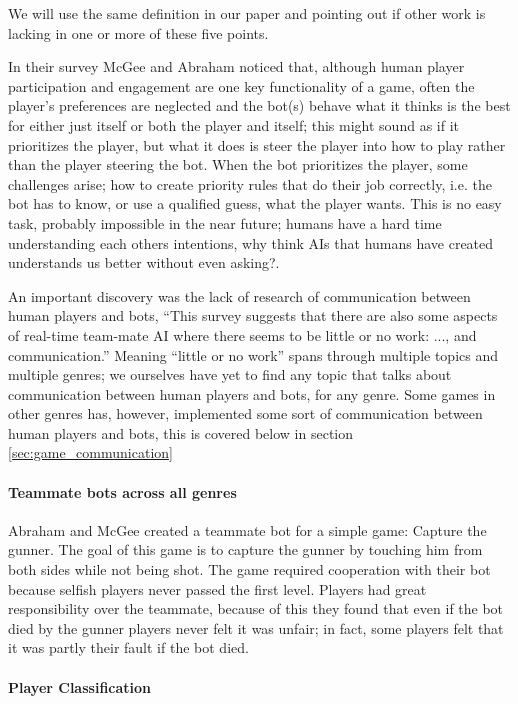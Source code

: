 We will use the same definition in our paper and pointing out if other work is lacking in one or more of these five points.

In their survey\cite{mcgee10} McGee and Abraham noticed that, although human player participation and engagement are one key functionality of a game\cite{reynolds03}, often the player's preferences are neglected and the bot(s) behave what it thinks is the best for either just itself or both the player and itself; this might sound as if it prioritizes the player, but what it does is steer the player into how to play rather than the player steering the bot. When the bot prioritizes the player, some challenges arise; how to create priority rules that do their job correctly\cite{mcgee10}, i.e. the bot has to know, or use a qualified guess, what the player wants. This is no easy task, probably impossible in the near future; humans have a hard time understanding each others intentions, why think AIs that humans have created understands us better\cite{norman07} without even asking?.

An important discovery was the lack of research of communication between human players and bots, “This survey suggests that there are also some aspects of real-time team-mate AI where there seems to be little or no work: ..., and communication.”\cite{mcgee10} Meaning “little or no work” spans through multiple topics and multiple genres; we ourselves have yet to find any topic that talks about communication between human players and bots, for any genre. Some games in other genres has, however, implemented some sort of communication between human players and bots, this is covered below in section \ref{sec:game_communication}

\paragraph{Teammate bots across all genres}
Abraham and McGee created a teammate bot for a simple game: Capture the gunner\cite{abraham10}. The goal of this game is to capture the gunner by touching him from both sides while not being shot. The game required cooperation with their bot because selfish players never passed the first level. Players had great responsibility over the teammate, because of this they found that even if the bot died by the gunner players never felt it was unfair; in fact, some players felt that it was partly their fault if the bot died.


\paragraph{Player Classification}


